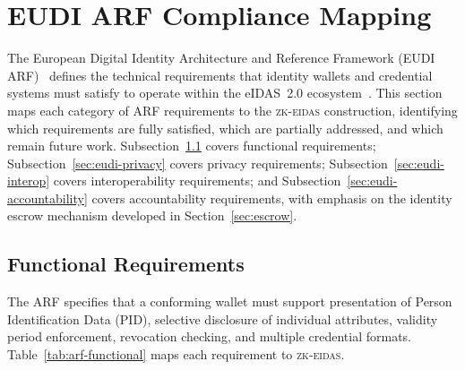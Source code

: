 \section{EUDI ARF Compliance Mapping}\label{sec:eudi-mapping}

The European Digital Identity Architecture and Reference Framework
(EUDI ARF)~\cite{eudi-arf} defines the technical requirements that
identity wallets and credential systems must satisfy to operate within
the eIDAS~2.0 ecosystem~\cite{eidas2}.
This section maps each category of ARF requirements to the
\textsc{zk-eidas} construction, identifying which requirements are
fully satisfied, which are partially addressed, and which remain
future work.
Subsection~\ref{sec:eudi-functional} covers functional requirements;
Subsection~\ref{sec:eudi-privacy} covers privacy requirements;
Subsection~\ref{sec:eudi-interop} covers interoperability requirements;
and Subsection~\ref{sec:eudi-accountability} covers accountability
requirements, with emphasis on the identity escrow mechanism developed
in Section~\ref{sec:escrow}.

\subsection{Functional Requirements}\label{sec:eudi-functional}

The ARF specifies that a conforming wallet must support presentation of
Person Identification Data (PID), selective disclosure of individual
attributes, validity period enforcement, revocation checking, and
multiple credential formats.
Table~\ref{tab:arf-functional} maps each requirement to
\textsc{zk-eidas}.

